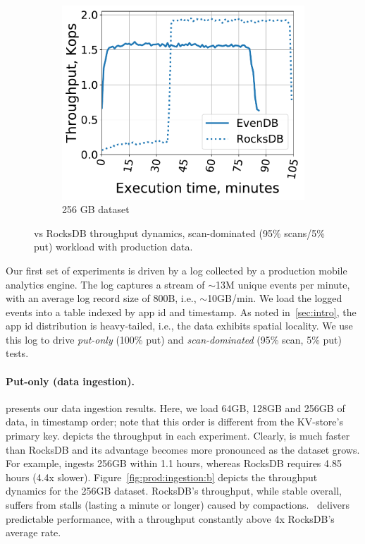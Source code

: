 \begin{figure}[tb]
\begin{subfigure}{0.29\linewidth}
\includegraphics[width=\textwidth]{figs/throughput_256_scans_10s_line.pdf}
\caption{256 GB dataset}
\label{fig:prod:analytics:c}
\end{subfigure}
\caption{\sys\/ vs RocksDB throughput dynamics,  scan-dominated (95\% scans/5\% put) workload with production data.}
\label{fig:prod:analytics}
\end{figure}



Our first set of experiments is driven by a log collected by a production mobile analytics engine. The log captures 
a stream  of $\sim$13M unique events per minute, with an average log record size of 800B, i.e., $\sim$10GB/min. 
We load the logged events into a table indexed by app id and timestamp. 
As noted in~\cref{sec:intro}, the app id distribution is heavy-tailed, i.e., the data exhibits spatial locality. 
We use this log to drive \emph{put-only} (100\% put) and \emph{scan-dominated} 
(95\% scan, 5\% put) tests.

\paragraph{Put-only (data ingestion).} 
 presents our  data ingestion results. 
Here, we load 64GB, 128GB and 256GB of data, in timestamp order; note that this order is different from the KV-store's primary key. 
  depicts the throughput in each experiment. Clearly, \sys\/ is much faster than RocksDB and its advantage 
becomes more pronounced as the dataset grows. For example, \sys\/ ingests 256GB  within 1.1 hours, 
whereas RocksDB requires 4.85 hours (4.4x slower). Figure~\ref{fig:prod:ingestion:b} depicts the  
throughput dynamics for the 256GB dataset. RocksDB's throughput, while stable overall, suffers from stalls 
(lasting a minute or longer) caused by compactions. 
\sys\ delivers predictable performance, with a throughput constantly above 4x RocksDB's average rate.

